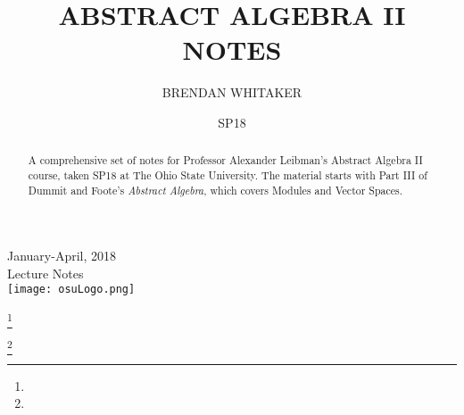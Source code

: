\documentclass[9pt,reqno,twoside]{amsbook}
\theoremstyle{plain}
\numberwithin{section}{chapter}
\numberwithin{equation}{chapter}
\theoremstyle{definition}
\theoremstyle{remark}
\theoremstyle{plain}
\begin{document}
\begin{titlepage}


{\large January-April, 2018 \\Lecture Notes}\\[1cm] %


\vspace{15mm}
\texttt{[image: osuLogo.png]}\\[1cm] %
 

\vfill %

\end{titlepage}


\title{ABSTRACT ALGEBRA II NOTES}


\author{BRENDAN WHITAKER}
\address{}
\curraddr{}
\email{}
\thanks{}

\author{}
\address{}
\curraddr{}
\email{}
\thanks{}


\keywords{}

\date{SP18}

\begin{abstract}
A comprehensive set of notes for Professor Alexander Leibman's Abstract Algebra II course, taken SP18 at The Ohio State University. The material starts with Part III of Dummit and Foote's \textit{Abstract Algebra}, which covers Modules and Vector Spaces. 
\end{abstract}
\end{document}
